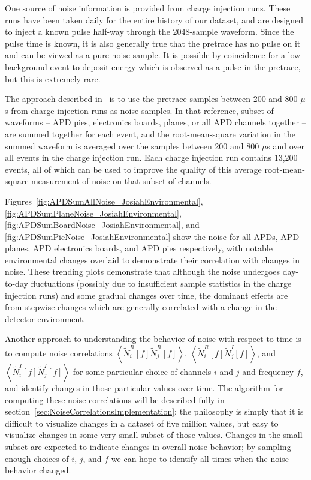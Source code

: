 One source of noise information is provided from charge injection runs.  These runs have been taken daily for the entire history of our dataset, and are designed to inject a known pulse half-way through the 2048-sample waveform.  Since the pulse time is known, it is also generally true that the pretrace has no pulse on it and can be viewed as a pure noise sample.  It is possible by coincidence for a low-background event to deposit energy which is observed as a pulse in the pretrace, but this is extremely rare.

The approach described in~\cite{JosiahCoherentAPDNoise} is to use the pretrace samples between 200 and 800 $\mu$s from charge injection runs as noise samples.  In that reference, subset of waveforms -- APD pies, electronics boards, planes, or all APD channels together -- are summed together for each event, and the root-mean-square variation in the summed waveform is averaged over the samples between 200 and 800 $\mu$s and over all events in the charge injection run.  Each charge injection run contains 13,200 events, all of which can be used to improve the quality of this average root-mean-square measurement of noise on that subset of channels.

Figures~\ref{fig:APDSumAllNoise_JosiahEnvironmental}, \ref{fig:APDSumPlaneNoise_JosiahEnvironmental}, \ref{fig:APDSumBoardNoise_JosiahEnvironmental}, and \ref{fig:APDSumPieNoise_JosiahEnvironmental} show the noise for all APDs, APD planes, APD electronics boards, and APD pies respectively, with notable environmental changes overlaid to demonstrate their correlation with changes in noise.  These trending plots demonstrate that although the noise undergoes day-to-day fluctuations (possibly due to insufficient sample statistics in the charge injection runs) and some gradual changes over time, the dominant effects are from stepwise changes which are generally correlated with a change in the detector environment.

Another approach to understanding the behavior of noise with respect to time is to compute noise correlations $\left<\widetilde{N}^R_i[f]\widetilde{N}^R_j[f]\right>$, $\left<\widetilde{N}^R_i[f]\widetilde{N}^I_j[f]\right>$, and $\left<\widetilde{N}^I_i[f]\widetilde{N}^I_j[f]\right>$ for some particular choice of channels $i$ and $j$ and frequency $f$, and identify changes in those particular values over time.  The algorithm for computing these noise correlations will be described fully in section~\ref{sec:NoiseCorrelationsImplementation}; the philosophy is simply that it is difficult to visualize changes in a dataset of five million values, but easy to visualize changes in some very small subset of those values.  Changes in the small subset are expected to indicate changes in overall noise behavior; by sampling enough choices of $i$, $j$, and $f$ we can hope to identify all times when the noise behavior changed.

